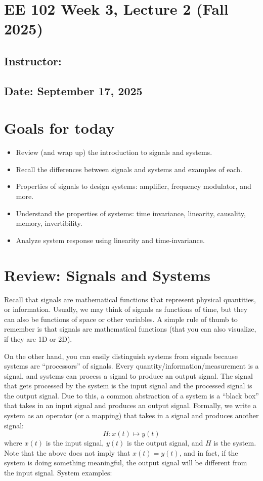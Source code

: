 \documentclass{ee102_notes}
\renewcommand{\releasedate}{September 17, 2025}
\begin{document}
\section*{EE 102 Week 3, Lecture 2 (Fall 2025)}
\subsection*{Instructor: \instructor}
\subsection*{Date: \releasedate}

\section{Goals for today}
\begin{itemize}
    \item Review (and wrap up) the introduction to signals and systems.
    \item Recall the differences between signals and systems and examples of each. 
    \item Properties of signals to design systems: amplifier, frequency modulator, and more. 
    \item Understand the properties of systems: time invariance, linearity, causality, memory, invertibility.
    \item Analyze system response using linearity and time-invariance.
\end{itemize}

\section{Review: Signals and Systems}
Recall that signals are mathematical functions that represent physical quantities, or information. Usually, we may think of signals as functions of time, but they can also be functions of space or other variables. A simple rule of thumb to remember is that signals are mathematical functions (that you can also visualize, if they are 1D or 2D).

On the other hand, you can easily distinguish systems from signals because systems are ``processors'' of signals. Every quantity/information/measurement is a signal, and systems can process a signal to produce an output signal. The signal that gets processed by the system is the input signal and the processed signal is the output signal. Due to this, a common abstraction of a system is a ``black box'' that takes in an input signal and produces an output signal. Formally, we write a system as an operator (or a mapping) that takes in a signal and produces another signal:
\[
    H: x(t) \mapsto y(t) 
\]
where $x(t)$ is the input signal, $y(t)$ is the output signal, and $H$ is the system. Note that the above does not imply that $x(t) = y(t)$, and in fact, if the system is doing something meaningful, the output signal will be different from the input signal. System examples:
\end{document}
